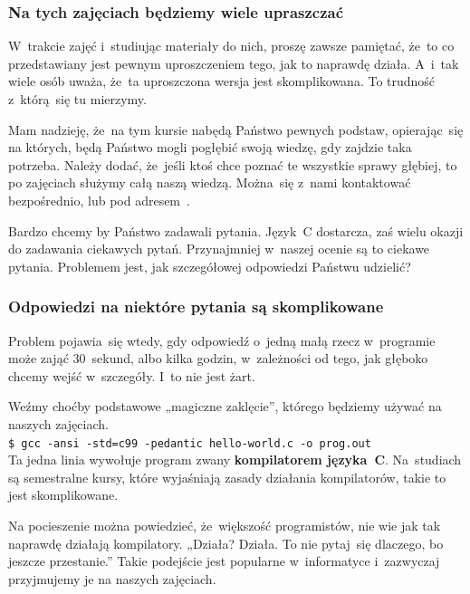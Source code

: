 \documentclass[10pt,t]{beamer}
\begin{document}
\begin{frame}
  \frametitle{Na tych zajęciach będziemy wiele upraszczać}


  W~trakcie zajęć i~studiując materiały do nich, proszę zawsze pamiętać,
  że~to co przedstawiany jest pewnym uproszczeniem tego, jak to naprawdę
  działa. A~i~tak wiele osób uważa, że~ta uproszczona wersja jest
  skomplikowana. To trudność z~którą~się tu mierzymy.

  Mam nadzieję, że~na tym kursie nabędą Państwo pewnych podstaw,
  opierając~się na których, będą Państwo mogli pogłębić swoją wiedzę,
  gdy zajdzie taka potrzeba. Należy dodać, że~jeśli ktoś chce poznać
  te wszystkie sprawy głębiej, to po zajęciach służymy całą naszą wiedzą.
  Można~się z~nami kontaktować bezpośrednio, lub pod adresem~\email.

  \alert{Bardzo} chcemy by Państwo zadawali pytania. Język~C dostarcza, zaś
  wielu okazji do zadawania ciekawych pytań. Przynajmniej w~naszej ocenie
  są to ciekawe pytania. Problemem jest, jak szczegółowej odpowiedzi
  Państwu udzielić?

\end{frame}





\begin{frame}
  \frametitle{Odpowiedzi na niektóre pytania są skomplikowane}


  Problem pojawia~się wtedy, gdy odpowiedź o~jedną małą rzecz w~programie
  może zająć $30$~sekund, albo kilka godzin, w~zależności od tego, jak
  głęboko chcemy wejść w~szczegóły. I~to nie jest żart.

  Weźmy choćby podstawowe „magiczne zaklęcie”, którego będziemy używać
  na naszych zajęciach. \\
  \texttt{\$ gcc -ansi -std=c99 -pedantic hello-world.c -o prog.out} \\
  Ta jedna linia wywołuje program zwany \textbf{kompilatorem języka~C}.
  Na~studiach są semestralne kursy, które wyjaśniają zasady działania
  kompilatorów, takie to jest skomplikowane.

  Na pocieszenie można powiedzieć, że~większość programistów, nie wie jak
  tak naprawdę działają kompilatory. „Działa? Działa. To nie pytaj~się
  dlaczego, bo jeszcze przestanie.” Takie podejście jest popularne
  w~informatyce i~zazwyczaj przyjmujemy je na naszych zajęciach.

\end{frame}
\end{document}
